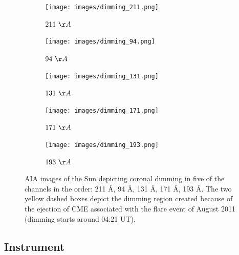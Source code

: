 \begin{figure}[h!]

    \begin{subfigure}[b]{0.3\textwidth}
        \centering
        \texttt{[image: images/dimming\_211.png]}
        \caption{$211 \ \AA$}
        \label{fig:dimming_211}
    \end{subfigure}
    \hfill
    \begin{subfigure}[b]{0.3\textwidth}
        \centering
        \texttt{[image: images/dimming\_94.png]}
        \caption{$94 \ \AA$}
        \label{fig:dimming_94}
    \end{subfigure}
    \hfill
    \begin{subfigure}[b]{0.3\textwidth}
        \centering
        \texttt{[image: images/dimming\_131.png]}
        \caption{$131 \ \AA$}
        \label{fig:dimming_131}
    \end{subfigure}

    \begin{center}
        \begin{subfigure}[b]{0.3\textwidth}
            \centering
            \texttt{[image: images/dimming\_171.png]}
            \caption{$171 \ \AA$}
            \label{fig:dimming_171}
        \end{subfigure}
        \hspace{0.5cm}
        \begin{subfigure}[b]{0.3\textwidth}
            \centering
            \texttt{[image: images/dimming\_193.png]}
            \caption{$193 \ \AA$}
            \label{fig:dimming_193}
        \end{subfigure}
    \end{center}
    \caption[AIA images of Coronal Dimming regions on the Sun]{AIA images of the Sun depicting coronal dimming in five of the channels in the order: 211 \AA, 94 \AA, 131 \AA, 171 \AA, 193 \AA. The two yellow dashed boxes depict the dimming region created because of the ejection of CME associated with the flare event of  August 2011 (dimming starts around 04:21 UT).}
    \label{fig:dimming_5_channels}
\end{figure}

\subsection{Instrument}

